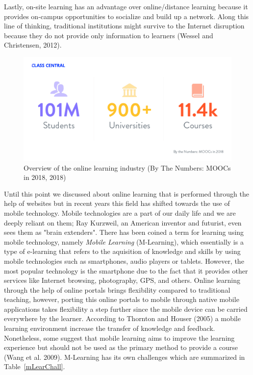 \documentclass[11]{article}
\begin{document}
Lastly,  on-site learning has an advantage over online/distance learning because it provides on-campus opportunities to socialize and build up a network. Along this line of thinking, traditional institutions might survive to the Internet disruption because they do not provide only information to learners (Wessel and Christensen, 2012). \\
\begin{figure}[H]
	\includegraphics[scale=0.45]{stats.png}
	\caption{Overview of the online learning industry (By The Numbers: MOOCs in 2018, 2018)}	
\end{figure}
\indent
	Until this point we discussed about online learning that is performed through the help of websites but in recent years this field has shifted towards the use of mobile technology.  Mobile technologies are a part of our daily life and we are deeply reliant on them; Ray Kurzweil, an American inventor and futurist, even sees them as "brain extenders". There has been coined a term for learning using mobile technology, namely \textit{Mobile Learning} (M-Learning), which essentially is a type of e-learning that refers to the aquisition of knowledge and skills by using mobile technologies such as smartphones, audio players or tablets. However, the most popular technology is the smartphone due to the fact that it provides other services like Internet browsing, photography, GPS, and others. Online learning through the help of online portals brings flexibility compared to traditional teaching, however, porting this online portals to mobile through native mobile applications takes flexibility a step further since the mobile device can be carried everywhere by the learner. According to Thornton and Houser (2005) a mobile learning environment increase the transfer of knowledge and feedback. Nonetheless, some suggest that mobile learning aims to improve the learning experience but should not be used as the primary method to provide a course (Wang et al. 2009). M-Learning has its own challenges which are summarized in Table~\ref{mLearChall}.
\end{document}
